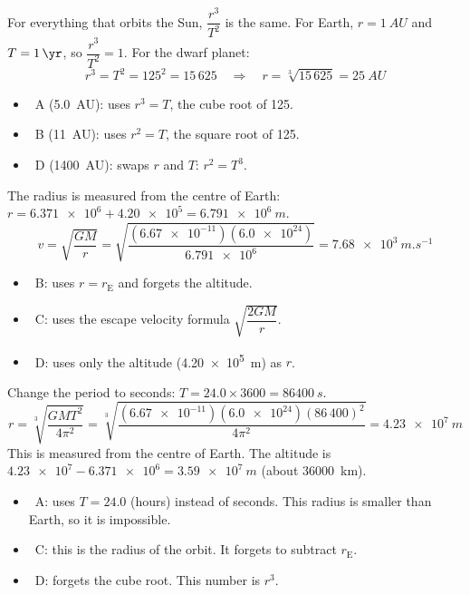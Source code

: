\documentclass[12pt]{article}
\begin{document}
\begin{practiceanswers}
\begin{practiceans}
  For everything that orbits the Sun, $\dfrac{r^3}{T^2}$ is the same. For Earth, $r = \qty{1}{AU}$ and
  $T = \qty{1}{\yr}$, so $\dfrac{r^3}{T^2} = 1$. For the dwarf planet:
  \[ r^3 = T^2 = 125^2 = 15\,625 \quad\Rightarrow\quad r = \sqrt[3]{15\,625} = \qty{25}{AU} \]
  \begin{itemize}
    \item \xmark\ A (\qty{5.0}{AU}): uses $r^3 = T$, the cube root of 125.
    \item \xmark\ B (\qty{11}{AU}): uses $r^2 = T$, the square root of 125.
    \item \xmark\ D (\qty{1400}{AU}): swaps $r$ and $T$: $r^2 = T^3$.
  \end{itemize}
\end{practiceans}

\begin{practiceans}
  The radius is measured from the centre of Earth:
  $r = \num{6.371e6} + \num{4.20e5} = \qty{6.791e6}{m}$.
  \[ v = \sqrt{\frac{GM}{r}} = \sqrt{\frac{(\num{6.67e-11})(\num{6.0e24})}{\num{6.791e6}}}
       = \qty{7.68e3}{m.s^{-1}} \]
  \begin{itemize}
    \item \xmark\ B: uses $r = r_\mathrm{E}$ and forgets the altitude.
    \item \xmark\ C: uses the escape velocity formula $\sqrt{\dfrac{2GM}{r}}$.
    \item \xmark\ D: uses only the altitude (\qty{4.20e5}{m}) as $r$.
  \end{itemize}
\end{practiceans}

\begin{practiceans}
  Change the period to seconds: $T = 24.0 \times 3600 = \qty{86400}{s}$.
  \[ r = \sqrt[3]{\frac{GMT^2}{4\pi^2}}
       = \sqrt[3]{\frac{(\num{6.67e-11})(\num{6.0e24})(86\,400)^2}{4\pi^2}}
       = \qty{4.23e7}{m} \]
  This is measured from the centre of Earth. The altitude is
  $\num{4.23e7} - \num{6.371e6} = \qty{3.59e7}{m}$ (about \qty{36000}{km}).
  \begin{itemize}
    \item \xmark\ A: uses $T = 24.0$ (hours) instead of seconds. This radius is smaller than
          Earth, so it is impossible.
    \item \xmark\ C: this is the radius of the orbit. It forgets to subtract $r_\mathrm{E}$.
    \item \xmark\ D: forgets the cube root. This number is $r^3$.
  \end{itemize}
\end{practiceans}


\end{practiceanswers}
\end{document}
